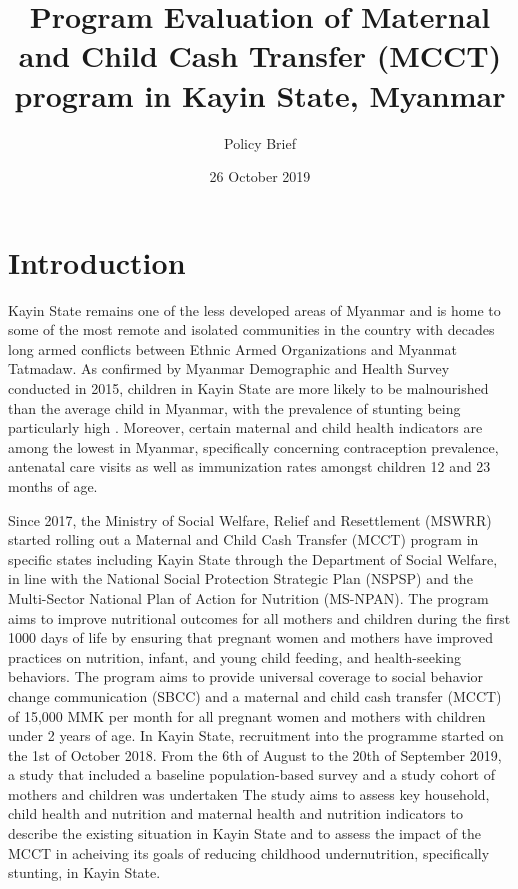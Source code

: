 \documentclass[12pt,a4paper]{article}
\title{Program Evaluation of Maternal and Child Cash Transfer (MCCT) program in Kayin State, Myanmar}
\subtitle{Policy Brief}
\author{}
\date{26 October 2019}
\begin{document}
\maketitle

{
\hypersetup{linkcolor=black}
\setcounter{tocdepth}{4}
\tableofcontents
}
\newpage

\hypertarget{intro}{%
\section{Introduction}\label{intro}}

Kayin State remains one of the less developed areas of Myanmar and is home to some of the most remote and isolated communities in the country with decades long armed conflicts between Ethnic Armed Organizations and Myanmat Tatmadaw. As confirmed by Myanmar Demographic and Health Survey conducted in 2015, children in Kayin State are more likely to be malnourished than the average child in Myanmar, with the prevalence of stunting being particularly high \citep{MinistryofHealthandSports-MoHS/Myanmar2017}. Moreover, certain maternal and child health indicators are among the lowest in Myanmar, specifically concerning contraception prevalence, antenatal care visits as well as immunization rates amongst children 12 and 23 months of age.

Since 2017, the Ministry of Social Welfare, Relief and Resettlement (MSWRR) started rolling out a Maternal and Child Cash Transfer (MCCT) program in specific states including Kayin State through the Department of Social Welfare, in line with the National Social Protection Strategic Plan (NSPSP) and the Multi-Sector National Plan of Action for Nutrition (MS-NPAN). The program aims to improve nutritional outcomes for all mothers and children during the first 1000 days of life by ensuring that pregnant women and mothers have improved practices on nutrition, infant, and young child feeding, and health-seeking behaviors. The program aims to provide universal coverage to social behavior change communication (SBCC) and a maternal and child cash transfer (MCCT) of 15,000 MMK per month for all pregnant women and mothers with children under 2 years of age. In Kayin State, recruitment into the programme started on the 1st of October 2018. From the 6th of August to the 20th of September 2019, a study that included a baseline population-based survey and a study cohort of mothers and children was undertaken The study aims to assess key household, child health and nutrition and maternal health and nutrition indicators to describe the existing situation in Kayin State and to assess the impact of the MCCT in acheiving its goals of reducing childhood undernutrition, specifically stunting, in Kayin State.
\end{document}
